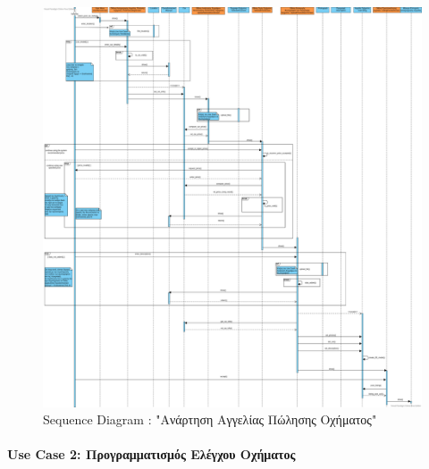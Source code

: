 \documentclass{../ol-softwaremanual}
\begin{document}
	\newpage
	
	\begin{figure}[htbp!]
		\centering
		\includegraphics[scale=0.2]{img/seq_post_car_listing.png}
		\caption{\en Sequence Diagram : "\gr Ανάρτηση Αγγελίας Πώλησης Οχήματος\en"\gr}
	\end{figure}
	
	
	\newpage
	
	\paragraph{\en Use Case 2: \gr Προγραμματισμός Ελέγχου Οχήματος}
	
\end{document}
